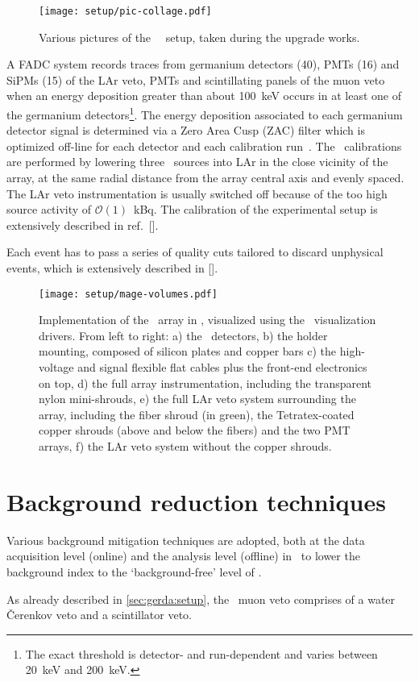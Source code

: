 \begin{figure}
  \texttt{[image: setup/pic-collage.pdf]}
  \caption{%
    Various pictures of the \gerda\ \phasetwo\ setup, taken during the upgrade
    works.
  }\label{fig:setup:pictures}
\end{figure}

A FADC system records traces from germanium detectors (40), PMTs (16) and SiPMs (15) of
the LAr veto, PMTs and scintillating panels of the muon veto when an energy deposition
greater than about 100~keV occurs in at least one of the germanium detectors\footnote{The
exact threshold is detector- and run-dependent and varies between 20~keV and 200~keV.}.
The energy deposition associated to each germanium detector signal is determined via a
Zero Area Cusp (ZAC) filter which is optimized off-line for each detector and each
calibration run~\cite{Agostini2015}. The \gerda\ calibrations are performed by lowering
three \Th\ sources into LAr in the close vicinity of the array, at the same radial
distance from the array central axis and evenly spaced. The LAr veto instrumentation is
usually switched off because of the too high source activity of $\mathcal{O}(1)$~kBq. The
calibration of the experimental setup is extensively described in ref.~[].

Each event has to pass a series of quality cuts tailored to discard unphysical events,
which is extensively described in [].

\begin{figure}
  \centering
  \texttt{[image: setup/mage-volumes.pdf]}
  \caption{%
    Implementation of the \gerda\ array in \mage, visualized using the
    \geant\ visualization drivers. From left to right: a) the \gerda\
    detectors, b) the holder mounting, composed of silicon plates and
    copper bars c) the high-voltage and signal flexible flat cables plus
    the front-end electronics on top, d) the full array instrumentation,
    including the transparent nylon mini-shrouds, e) the full LAr veto
    system surrounding the array, including the fiber shroud (in green),
    the Tetratex\reg-coated copper shrouds (above and below the fibers) and
    the two PMT arrays, f) the LAr veto system without the copper
    shrouds.%
  }\label{fig:setup:magevolumes}
\end{figure}

\section{Background reduction techniques}%
\label{sec:gerda:cuts}

Various background mitigation techniques are adopted, both at the data acquisition level
(online) and the analysis level (offline) in \gerda\ to lower the background index to the
`background-free' level of \pIIbi.

As already described in \cref{sec:gerda:setup}, the \gerda\ muon veto comprises of a water
\v{C}erenkov veto and a scintillator veto.

